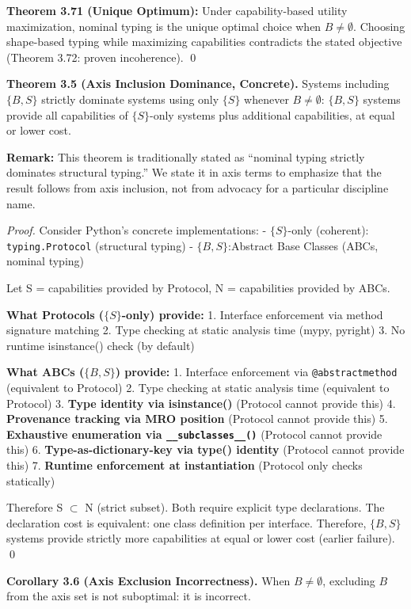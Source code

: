 \textbf{Theorem 3.71 (Unique Optimum):} Under capability-based utility
maximization, nominal typing is the unique optimal choice when \(B \neq
\emptyset\). Choosing shape-based typing while maximizing capabilities
contradicts the stated objective (Theorem 3.72: proven incoherence).
\qed

\textbf{Theorem 3.5 (Axis Inclusion Dominance, Concrete).} Systems including $\{B, S\}$
strictly dominate systems using only $\{S\}$ whenever \(B \neq \emptyset\):
$\{B, S\}$ systems provide all capabilities of $\{S\}$-only systems plus additional
capabilities, at equal or lower cost.

\textbf{Remark:} This theorem is traditionally stated as ``nominal typing strictly dominates structural typing.'' We state it in axis terms to emphasize that the result follows from axis inclusion, not from advocacy for a particular discipline name.

\emph{Proof.} Consider Python's concrete implementations: - $\{S\}$-only (coherent):
\texttt{typing.Protocol} (structural typing) - $\{B, S\}$:Abstract Base
Classes (ABCs, nominal typing)

Let S = capabilities provided by Protocol, N = capabilities provided by
ABCs.

\textbf{What Protocols ($\{S\}$-only) provide:} 1. Interface enforcement via method
signature matching 2. Type checking at static analysis time (mypy,
pyright) 3. No runtime isinstance() check (by default)

\textbf{What ABCs ($\{B, S\}$) provide:} 1. Interface enforcement via
\texttt{@abstractmethod} (equivalent to Protocol) 2. Type checking at
static analysis time (equivalent to Protocol) 3. \textbf{Type identity
via isinstance()} (Protocol cannot provide this) 4. \textbf{Provenance
tracking via MRO position} (Protocol cannot provide this) 5.
\textbf{Exhaustive enumeration via \texttt{\_\_subclasses\_\_()}}
(Protocol cannot provide this) 6. \textbf{Type-as-dictionary-key via
type() identity} (Protocol cannot provide this) 7. \textbf{Runtime
enforcement at instantiation} (Protocol only checks statically)

Therefore S \(\subset\) N (strict subset). Both require explicit type
declarations. The declaration cost is equivalent: one class definition
per interface. Therefore, $\{B, S\}$ systems provide strictly more
capabilities at equal or lower cost (earlier failure). \qed

\textbf{Corollary 3.6 (Axis Exclusion Incorrectness).} When
\(B \neq \emptyset\), excluding $B$ from the axis set is not suboptimal: it is incorrect.

